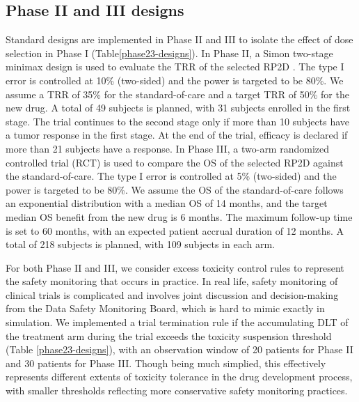 \documentclass[11pt]{article}
\begin{document}
\subsection{Phase II and III designs}
Standard designs are implemented in Phase II and III to isolate the effect of dose selection in Phase I (Table\ref{phase23-designs}). In Phase II, a Simon two-stage minimax design is used to evaluate the TRR of the selected RP2D \parencite{simon2stage}. The type I error is controlled at 10\% (two-sided) and the power is targeted to be 80\%. We assume a TRR of 35\% for the standard-of-care and a target TRR of 50\% for the new drug. A total of 49 subjects is planned, with 31 subjects enrolled in the first stage. The trial continues to the second stage only if more than 10 subjects have a tumor response in the first stage. At the end of the trial, efficacy is declared if more than 21 subjects have a response. In Phase III, a two-arm randomized controlled trial (RCT) is used to compare the OS of the selected RP2D against the standard-of-care. The type I error is controlled at 5\% (two-sided) and the power is targeted to be 80\%. We assume the OS of the standard-of-care follows an exponential distribution with a median OS of 14 months, and the target median OS benefit from the new drug is 6 months. The maximum follow-up time is set to 60 months, with an expected patient accrual duration of 12 months. A total of 218 subjects is planned, with 109 subjects in each arm.

For both Phase II and III, we consider excess toxicity control rules to represent the safety monitoring that occurs in practice. In real life, safety monitoring of clinical trials is complicated and involves joint discussion and decision-making from the Data Safety Monitoring Board, which is hard to mimic exactly in simulation. We implemented a trial termination rule if the accumulating DLT of the treatment arm during the trial exceeds the toxicity suspension threshold (Table \ref{phase23-designs}), with an observation window of 20 patients for Phase II and 30 patients for Phase III. Though being much simplied, this effectively represents different extents of toxicity tolerance in the drug development process, with smaller thresholds reflecting more conservative safety monitoring practices.  
\end{document}
